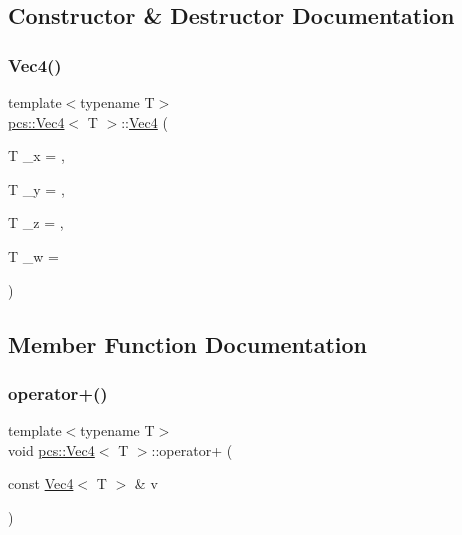 \subsection{Constructor \& Destructor Documentation}
\mbox{\label{structpcs_1_1Vec4_a27f1a1105518c6ebcaa93142da7261f2}} 
\subsubsection{\texorpdfstring{Vec4()}{Vec4()}}
{\footnotesize\ttfamily template$<$typename T$>$ \\
\hyperlink{structpcs_1_1Vec4}{pcs\+::\+Vec4}$<$ T $>$\+::\hyperlink{structpcs_1_1Vec4}{Vec4} (\begin{DoxyParamCaption}\item[{T}]{\+\_\+x = {},  }\item[{T}]{\+\_\+y = {},  }\item[{T}]{\+\_\+z = {},  }\item[{T}]{\+\_\+w = {} }\end{DoxyParamCaption})\hspace{0.3cm}{\ttfamily [inline]}}



\subsection{Member Function Documentation}
\mbox{\label{structpcs_1_1Vec4_aa95db0b3357930d644043d68eabafc14}} 
\subsubsection{\texorpdfstring{operator+()}{operator+()}}
{\footnotesize\ttfamily template$<$typename T$>$ \\
void \hyperlink{structpcs_1_1Vec4}{pcs\+::\+Vec4}$<$ T $>$\+::operator+ (\begin{DoxyParamCaption}\item[{const \hyperlink{structpcs_1_1Vec4}{Vec4}$<$ T $>$ \&}]{v }\end{DoxyParamCaption})\hspace{0.3cm}{\ttfamily [inline]}}

